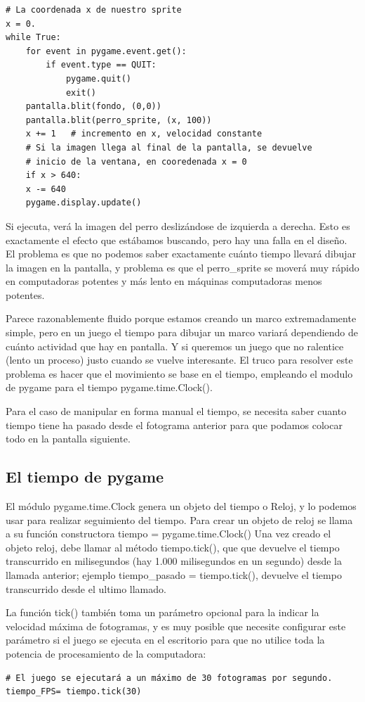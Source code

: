 {\begin{lstlisting}
# La coordenada x de nuestro sprite
x = 0.
while True:
    for event in pygame.event.get():
        if event.type == QUIT:
            pygame.quit()
            exit()
    pantalla.blit(fondo, (0,0))
    pantalla.blit(perro_sprite, (x, 100))
    x += 1   # incremento en x, velocidad constante
    # Si la imagen llega al final de la pantalla, se devuelve 
    # inicio de la ventana, en cooredenada x = 0
    if x > 640:
    x -= 640
    pygame.display.update()	
\end{lstlisting}


Si ejecuta, verá la imagen del perro deslizándose de izquierda a derecha. Esto es exactamente el efecto que estábamos 
buscando, pero hay una falla en el diseño. El problema es que no podemos saber exactamente cuánto tiempo llevará dibujar la imagen en la pantalla, y  problema es que el {\ttfamily perro\_sprite} se moverá muy rápido en computadoras  potentes y más lento en máquinas  computadoras menos potentes.

Parece razonablemente fluido porque estamos creando un marco extremadamente simple, pero en un juego el tiempo para 
dibujar un marco variará dependiendo de cuánto actividad que hay en pantalla. Y si queremos un juego que no ralentice (lento un proceso) 
justo cuando se vuelve interesante.  El truco para resolver este problema es hacer que el movimiento se base en el tiempo, empleando el modulo de pygame para el tiempo  {\ttfamily pygame.time.Clock()}.

Para el caso de manipular en forma manual el tiempo, se necesita saber cuanto tiempo tiene ha pasado desde el fotograma anterior
para que podamos colocar todo en la pantalla siguiente. 

\subsection{El tiempo de pygame}

El módulo  {\ttfamily pygame.time.Clock} genera un objeto del tiempo o Reloj, y lo podemos usar para realizar seguimiento  del tiempo.
Para crear un objeto de reloj se llama a su función constructora  {\ttfamily tiempo =  pygame.time.Clock()} 
Una vez creado el objeto reloj, debe llamar al método {\ttfamily tiempo.tick()}, que que devuelve
el tiempo transcurrido en milisegundos (hay 1.000 milisegundos en un segundo)  desde la llamada anterior; ejemplo 
{\ttfamily tiempo\_pasado = tiempo.tick()}, devuelve el tiempo transcurrido desde el ultimo llamado.

La función  {\ttfamily tick()}  también toma un parámetro opcional para la indicar la velocidad máxima de fotogramas, y es
 muy posible que necesite  configurar este parámetro si el juego se ejecuta en el escritorio para que no utilice toda la
  potencia de procesamiento de la computadora:
\begin{lstlisting}
# El juego se ejecutará a un máximo de 30 fotogramas por segundo.
tiempo_FPS= tiempo.tick(30)
\end{lstlisting}

}
